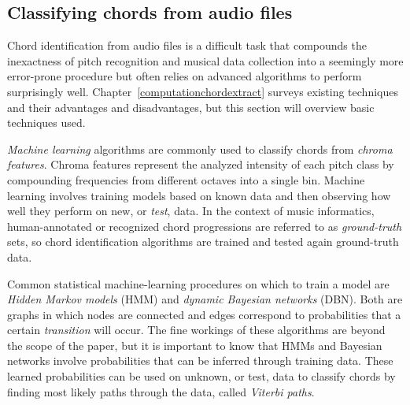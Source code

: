\subsection{Classifying chords from audio files}

Chord identification from audio files is a difficult task that compounds the inexactness of pitch recognition and musical data collection into a seemingly more error-prone procedure but often relies on advanced algorithms to perform surprisingly well. Chapter~\ref{computationchordextract} surveys existing techniques and their advantages and disadvantages, but this section will overview basic techniques used.

\textit{Machine learning} algorithms are commonly used to classify chords from \textit{chroma features}. Chroma features represent the analyzed intensity of each pitch class by compounding frequencies from different octaves into a single bin. Machine learning involves training models based on known data and then observing how well they perform on new, or \textit{test}, data. In the context of music informatics, human-annotated or recognized chord progressions are referred to as \textit{ground-truth} sets\cite{BurgoyneEtAl_2011_AnExpeGrouSet}, so chord identification algorithms are trained and tested again ground-truth data.

Common statistical machine-learning procedures on which to train a model are \textit{Hidden Markov models} (HMM) and \textit{dynamic Bayesian networks} (DBN). Both are graphs in which nodes are connected and edges correspond to probabilities that a certain \textit{transition} will occur. The fine workings of these algorithms are beyond the scope of the paper, but it is important to know that HMMs and Bayesian networks involve probabilities that can be inferred through training data. These learned probabilities can be used on unknown, or test, data to classify chords by finding most likely paths through the data, called \textit{Viterbi paths}.